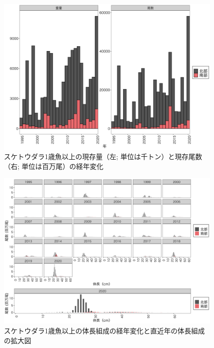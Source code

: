 \documentclass[11pt]{article} %
\begin{document}
\begin{linenumbers}
\begin{figure}[h]
  \centering
  \includegraphics[width = 14cm]{スケトウダラ１＋trend.png}
  \caption{スケトウダラ1歳魚以上の現存量（左; 単位は千トン）と現存尾数（右; 単位は百万尾）の経年変化}
\end{figure}

\begin{figure}[h]
  \centering
  \includegraphics[width = 14cm]{スケトウダラ1+length.png}
  \caption{スケトウダラ1歳魚以上の体長組成の経年変化と直近年の体長組成の拡大図}
\end{figure}


\end{linenumbers}
\end{document}
